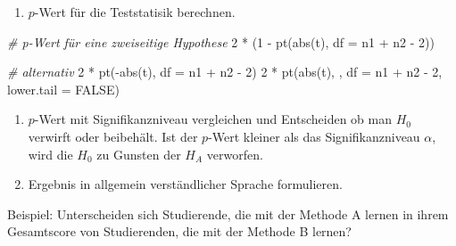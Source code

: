 \documentclass[
]{book}
\newenvironment{Shaded}{\begin{snugshade}}{\end{snugshade}}
\newcommand{\AttributeTok}[1]{\textcolor[rgb]{0.77,0.63,0.00}{#1}}
\newcommand{\CommentTok}[1]{\textcolor[rgb]{0.56,0.35,0.01}{\textit{#1}}}
\newcommand{\ConstantTok}[1]{\textcolor[rgb]{0.00,0.00,0.00}{#1}}
\newcommand{\DecValTok}[1]{\textcolor[rgb]{0.00,0.00,0.81}{#1}}
\newcommand{\FunctionTok}[1]{\textcolor[rgb]{0.00,0.00,0.00}{#1}}
\newcommand{\NormalTok}[1]{#1}
\newcommand{\SpecialCharTok}[1]{\textcolor[rgb]{0.00,0.00,0.00}{#1}}
\providecommand{\tightlist}{%
  \setlength{\itemsep}{0pt}\setlength{\parskip}{0pt}}
\begin{document}
\begin{enumerate}
\def\labelenumi{\arabic{enumi}.}
\setcounter{enumi}{5}
\tightlist
\item
  \(p\)-Wert für die Teststatisik berechnen.
\end{enumerate}

\begin{Shaded}
\begin{Highlighting}[]
\CommentTok{\# p{-}Wert für eine zweiseitige Hypothese}
\DecValTok{2} \SpecialCharTok{*}\NormalTok{ (}\DecValTok{1} \SpecialCharTok{{-}} \FunctionTok{pt}\NormalTok{(}\FunctionTok{abs}\NormalTok{(t), }\AttributeTok{df =}\NormalTok{ n1 }\SpecialCharTok{+}\NormalTok{ n2 }\SpecialCharTok{{-}} \DecValTok{2}\NormalTok{))}

\CommentTok{\# alternativ}
\DecValTok{2} \SpecialCharTok{*} \FunctionTok{pt}\NormalTok{(}\SpecialCharTok{{-}}\FunctionTok{abs}\NormalTok{(t), }\AttributeTok{df =}\NormalTok{ n1 }\SpecialCharTok{+}\NormalTok{ n2 }\SpecialCharTok{{-}} \DecValTok{2}\NormalTok{)}
\DecValTok{2} \SpecialCharTok{*} \FunctionTok{pt}\NormalTok{(}\FunctionTok{abs}\NormalTok{(t), , }\AttributeTok{df =}\NormalTok{ n1 }\SpecialCharTok{+}\NormalTok{ n2 }\SpecialCharTok{{-}} \DecValTok{2}\NormalTok{, }\AttributeTok{lower.tail =} \ConstantTok{FALSE}\NormalTok{)}
\end{Highlighting}
\end{Shaded}

\begin{enumerate}
\def\labelenumi{\arabic{enumi}.}
\setcounter{enumi}{6}
\item
  \(p\)-Wert mit Signifikanzniveau vergleichen und Entscheiden ob man \(H_0\) verwirft oder beibehält.
  Ist der \(p\)-Wert kleiner als das Signifikanzniveau \(\alpha\), wird die \(H_0\) zu Gunsten der \(H_A\) verworfen.
\item
  Ergebnis in allgemein verständlicher Sprache formulieren.
\end{enumerate}

Beispiel: Unterscheiden sich Studierende, die mit der Methode A lernen in ihrem Gesamtscore von Studierenden, die mit der Methode B lernen?
\end{document}
